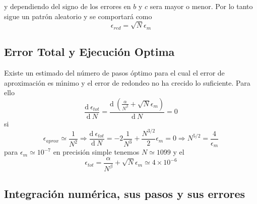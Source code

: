 \documentclass[spanish,titlepage,11pt]{article}
\begin{document}
y dependiendo del signo de los errores en $b$ y $c$ sera mayor o menor. Por lo
tanto sigue un patr\'{o}n aleatorio y se comportar\'{a} como
\begin{equation}
\epsilon_{red}=\sqrt{N}\epsilon_{m}%
\end{equation}

\subsection{Error Total y Ejecuci\'{o}n Optima}

Existe un estimado del n\'{u}mero de pasos \'{o}ptimo para el cual el error de
aproximaci\'{o}n es m\'{\i}nimo y el error de redondeo no ha crecido lo
suficiente. Para ello
\begin{equation}
\frac{\mathrm{d}\ \epsilon_{tot}}{\mathrm{d}\ N}=\frac{\mathrm{d}\ \left(
\frac{\alpha}{N^{\beta}}+\sqrt{N}\epsilon_{m}\right)  }{\mathrm{d}\ N}=0
\end{equation}
si
\begin{equation}
\epsilon_{aprox}\simeq\frac{1}{N^{2}}\Longrightarrow\frac{\mathrm{d}%
\ \epsilon_{tot}}{\mathrm{d}\ N}=-2\frac{1}{N^{3}}+\frac{N^{3/2}}{2}%
\epsilon_{m}=0\Longrightarrow N^{5/2}=\frac{4}{\epsilon_{m}}%
\end{equation}
para $\epsilon_{m}\simeq10^{-7}$ en precisi\'{o}n simple tenemos $N\simeq1099$
y el
\begin{equation}
\epsilon_{tot}=\frac{\alpha}{N^{\beta}}+\sqrt{N}\epsilon_{m}\simeq
4\times10^{-6}%
\end{equation}

\subsection{Integraci\'{o}n num\'{e}rica, sus pasos y sus errores}
\end{document}
